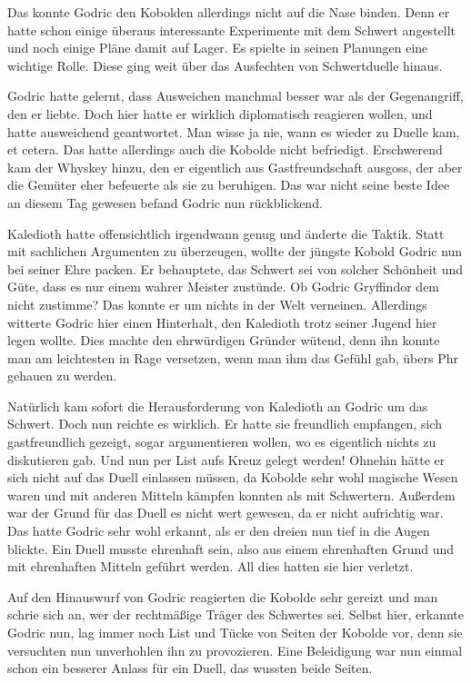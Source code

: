 \documentclass[fontsize=12pt]{scrartcl}
\begin{document}
	Das konnte Godric den Kobolden allerdings nicht auf die Nase binden. Denn er hatte schon einige überaus interessante Experimente mit dem Schwert angestellt und noch einige Pläne damit auf Lager. Es spielte in seinen Planungen eine wichtige Rolle. Diese ging weit über das Ausfechten von Schwertduelle hinaus. 
	
	Godric hatte gelernt, dass Ausweichen manchmal besser war als der Gegenangriff, den er liebte. Doch hier hatte er wirklich diplomatisch reagieren wollen, und hatte ausweichend geantwortet. Man wisse ja nie, wann es wieder zu Duelle kam, et cetera. Das hatte allerdings auch die Kobolde nicht befriedigt. Erschwerend kam der Whyskey hinzu, den er eigentlich aus Gastfreundschaft ausgoss, der aber die Gemüter eher befeuerte als sie zu beruhigen. Das war nicht seine beste Idee an diesem Tag gewesen befand Godric nun rückblickend. 
	
	Kaledioth hatte offensichtlich irgendwann genug und änderte die Taktik. Statt mit sachlichen Argumenten zu überzeugen, wollte der jüngste Kobold Godric nun bei seiner Ehre packen. Er behauptete, das Schwert sei von solcher Schönheit und Güte, dass es nur einem wahrer Meister zustünde. Ob Godric Gryffindor dem nicht zustimme? Das konnte er um nichts in der Welt verneinen. Allerdings witterte Godric hier einen Hinterhalt, den Kaledioth trotz seiner Jugend hier legen wollte. Dies machte den ehrwürdigen Gründer wütend, denn ihn konnte man am leichtesten in Rage versetzen, wenn man ihm das Gefühl gab, übers Phr gehauen zu werden. 
	
	Natürlich kam sofort die Herausforderung von Kaledioth an Godric um das Schwert. Doch nun reichte es wirklich. Er hatte sie freundlich empfangen, sich gastfreundlich gezeigt, sogar argumentieren wollen, wo es eigentlich nichts zu diskutieren gab. Und nun per List aufs Kreuz gelegt werden! Ohnehin hätte er sich nicht auf das Duell einlassen müssen, da Kobolde sehr wohl magische Wesen waren und mit anderen Mitteln kämpfen konnten als mit Schwertern. Außerdem war der Grund für das Duell es nicht wert gewesen, da er nicht aufrichtig war. Das hatte Godric sehr wohl erkannt, als er den dreien nun tief in die Augen blickte. Ein Duell musste ehrenhaft sein, also aus einem ehrenhaften Grund und mit ehrenhaften Mitteln geführt werden. All dies hatten sie hier verletzt. 
	
	Auf den Hinauswurf von Godric reagierten die Kobolde sehr gereizt und man schrie sich an, wer der rechtmäßige Träger des Schwertes sei. Selbst hier, erkannte Godric nun, lag immer noch List und Tücke von Seiten der Kobolde vor, denn sie versuchten nun unverhohlen ihn zu provozieren. Eine Beleidigung war nun einmal schon ein besserer Anlass für ein Duell, das wussten beide Seiten. 
	
\end{document}
